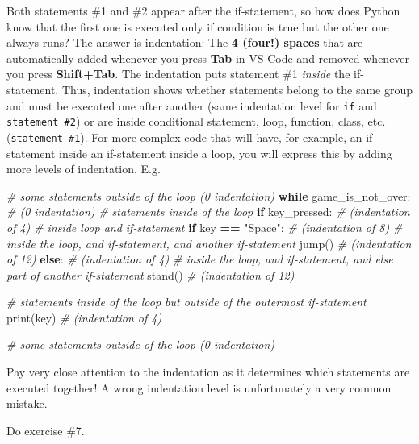 \documentclass[
]{book}
\newenvironment{Shaded}{\begin{snugshade}}{\end{snugshade}}
\newcommand{\BuiltInTok}[1]{#1}
\newcommand{\CommentTok}[1]{\textcolor[rgb]{0.56,0.35,0.01}{\textit{#1}}}
\newcommand{\ControlFlowTok}[1]{\textcolor[rgb]{0.13,0.29,0.53}{\textbf{#1}}}
\newcommand{\NormalTok}[1]{#1}
\newcommand{\OperatorTok}[1]{\textcolor[rgb]{0.81,0.36,0.00}{\textbf{#1}}}
\newcommand{\StringTok}[1]{\textcolor[rgb]{0.31,0.60,0.02}{#1}}
\begin{document}
Both statements \#1 and \#2 appear after the if-statement, so how does Python know that the first one is executed only if condition is true but the other one always runs? The answer is indentation: The \textbf{4 (four!) spaces} that are automatically added whenever you press \textbf{Tab} in VS Code and removed whenever you press \textbf{Shift+Tab}. The indentation puts statement \#1 \emph{inside} the if-statement. Thus, indentation shows whether statements belong to the same group and must be executed one after another (same indentation level for \texttt{if} and \texttt{statement\ \#2}) or are inside conditional statement, loop, function, class, etc. (\texttt{statement\ \#1}). For more complex code that will have, for example, an if-statement inside an if-statement inside a loop, you will express this by adding more levels of indentation. E.g.

\begin{Shaded}
\begin{Highlighting}[]
\CommentTok{\# some statements outside of the loop (0 indentation)}
\ControlFlowTok{while}\NormalTok{ game\_is\_not\_over: }\CommentTok{\# (0 indentation)}
    \CommentTok{\# statements inside of the loop }
    \ControlFlowTok{if}\NormalTok{ key\_pressed: }\CommentTok{\# (indentation of 4)}
        \CommentTok{\# inside loop and if{-}statement }
        \ControlFlowTok{if}\NormalTok{ key }\OperatorTok{==} \StringTok{"Space"}\NormalTok{: }\CommentTok{\# (indentation of 8)}
            \CommentTok{\# inside the loop, and if{-}statement, and another if{-}statement}
\NormalTok{            jump() }\CommentTok{\# (indentation of 12)}
        \ControlFlowTok{else}\NormalTok{: }\CommentTok{\# (indentation of 4)}
            \CommentTok{\# inside the loop, and if{-}statement, and else part of another if{-}statement}
\NormalTok{            stand() }\CommentTok{\# (indentation of 12)}
    
    \CommentTok{\# statements inside of the loop but outside of the outermost if{-}statement}
    \BuiltInTok{print}\NormalTok{(key) }\CommentTok{\# (indentation of 4)}
    
\CommentTok{\# some statements outside of the loop (0 indentation)}
\end{Highlighting}
\end{Shaded}

Pay very close attention to the indentation as it determines which statements are executed together! A wrong indentation level is unfortunately a very common mistake.

Do exercise \#7.
\end{document}
